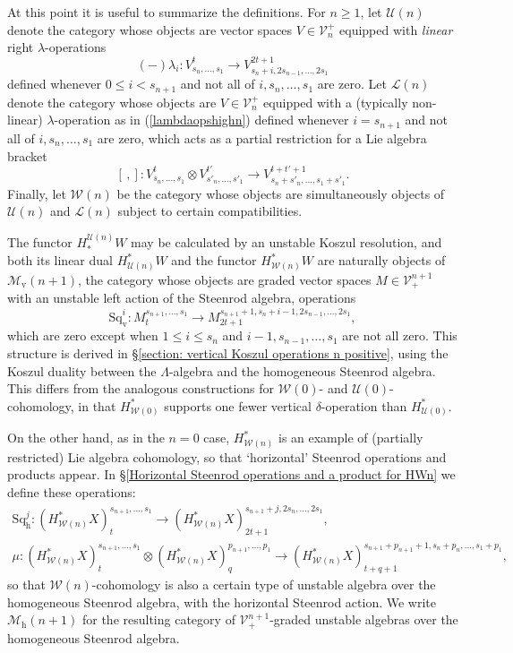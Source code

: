 \documentclass[11pt]{amsart} \renewcommand{\baselinestretch}{1.2}
\theoremstyle{plain}
\numberwithin{equation}{section} %
\theoremstyle{plain}
\numberwithin{equation}{chapter} %
\newcommand{\DASH}{\mathrm{-}}
\renewcommand{\to}{\longrightarrow}
\newcommand{\calU}{\mathcal{U}}
\newcommand{\calV}{\mathcal{V}}
\newcommand{\calw}{\mathcal{W}}
\newcommand{\calu}{\mathcal{U}}
\newcommand{\call}{\mathcal{L}}
\newcommand{\calMv}{\mathcal{M}\dver}
\newcommand{\calMh}{\mathcal{M}\dhor}
\newcommand{\vect}[2]{\calV^{#1}_{#2}}
\newcommand{\dver}{_\mathrm{v}}
\newcommand{\dhor}{_\mathrm{h}}
\newcommand{\Sqh}{\mathrm{Sq}\dhor}
\newcommand{\Sqv}{\mathrm{Sq}\dver}
\begin{document}
\begin{Introduction}
At this point it is useful to summarize the definitions. For $n\geq1$,
let $\calU(n)$ denote the category whose objects are vector spaces $V\in \vect{+}{n}$ equipped with  \emph{linear} right $\lambda$-operations
\begin{equation}\label{lambdaopshighn}
(\DASH)\lambda_i:V_{s_{n},\ldots,s_1}^t\to V_{s_{n}+i,2s_{n-1},\ldots,2s_1}^{2t+1}
\end{equation}
defined whenever $0\leq i< s_{n+1}$ and not all of $i,s_{n},\ldots,s_{1}$ are zero. Let $\call(n)$ denote the category whose objects are $V\in \vect{+}{n}$ equipped with a (typically non-linear) $\lambda$-operation as in (\ref{lambdaopshighn}) defined whenever $i= s_{n+1}$ and not all of $i,s_{n},\ldots,s_{1}$ are zero, which acts as a partial restriction for a Lie algebra bracket
\[[\,,]:V^{t}_{s_n,\ldots,s_1}\otimes V^{t'}_{s'_n,\ldots,s'_1}\to V^{t+t'+1}_{s_n+s'_n,\ldots,s_1+s'_1}.\]
Finally, let $\calw(n)$ be the category whose objects are simultaneously objects of $\calU(n)$ and $\call(n)$ subject to certain compatibilities.

The functor $H_*^{\calu(n)}W$ may be calculated by an unstable Koszul resolution, and both its linear dual $H^*_{\calu(n)}W$ and the functor $H^*_{\calw(n)}W$ are naturally objects of $\calMv(n+1)$, the category whose objects are graded vector spaces $M\in\vect{n+1}{+}$ with an unstable left action of the Steenrod algebra, operations%
\[\Sqv^i:M^{s_{n+1},\ldots,s_1}_t\to M^{s_{n+1}+1,s_n+i-1,2s_{n-1},\ldots,2s_1}_{2t+1},\]
which are zero except when $1\leq i \leq s_n$ and  $i-1,s_{n-1},\ldots,s_1$ are not all zero. This structure is derived in \S\ref{section: vertical Koszul operations n positive}, using the Koszul duality between the $\Lambda$-algebra and the homogeneous Steenrod algebra. This differs from the analogous constructions for $\calw(0)$- and $\calu(0)$-cohomology, in that $H^*_{\calw(0)}$ supports one fewer vertical $\delta$-operation than $H^*_{\calu(0)}$.

On the other hand, as in the $n=0$ case, $H^*_{\calw(n)}$ is an example of (partially restricted) Lie algebra cohomology, so that  `horizontal' Steenrod operations and products  appear. In \S\ref{Horizontal Steenrod operations and a product for HWn} we define these operations:
\begin{gather*}
\Sqh^j:(H^*_{\calw(n)}X)_t^{s_{n+1},\ldots,s_1}\to (H^*_{\calw(n)}X)_{2t+1}^{s_{n+1}+j,2s_{n},\ldots,2s_1},\\
\mu:(H^*_{\calw(n)}X)_t^{s_{n+1},\ldots,s_1}\otimes (H^*_{\calw(n)}X)_q^{p_{n+1},\ldots,p_1}\to (H^*_{\calw(n)}X)_{t+q+1}^{s_{n+1}+p_{n+1}+1,s_{n}+p_{n},\ldots,s_1+p_1},
\end{gather*}
so that $\calw(n)$-cohomology is also a certain type of unstable algebra over the homogeneous Steenrod algebra, %
with the horizontal Steenrod action. We write $\calMh(n+1)$ for the resulting category of $\vect{n+1}{+}$-graded unstable algebras over the homogeneous Steenrod algebra.



\end{Introduction}
\end{document}
